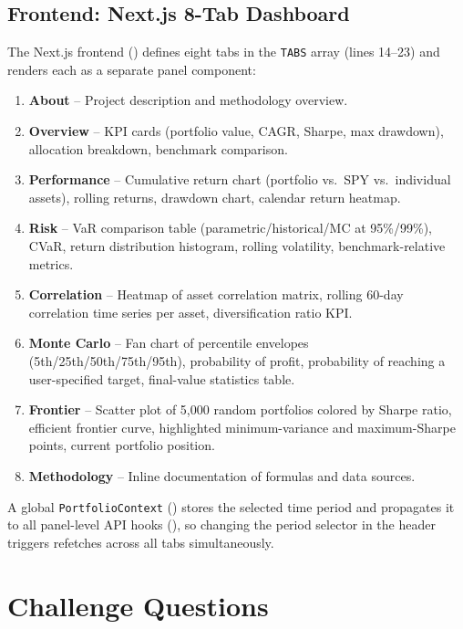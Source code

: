 \subsection{Frontend: Next.js 8-Tab Dashboard}

The Next.js frontend () defines eight tabs in the \texttt{TABS} array (lines 14--23) and renders each as a separate panel component:

\begin{enumerate}
  \item \textbf{About} -- Project description and methodology overview.
  \item \textbf{Overview} -- KPI cards (portfolio value, CAGR, Sharpe, max drawdown), allocation breakdown, benchmark comparison.
  \item \textbf{Performance} -- Cumulative return chart (portfolio vs.\ SPY vs.\ individual assets), rolling returns, drawdown chart, calendar return heatmap.
  \item \textbf{Risk} -- VaR comparison table (parametric/historical/MC at 95\%/99\%), CVaR, return distribution histogram, rolling volatility, benchmark-relative metrics.
  \item \textbf{Correlation} -- Heatmap of asset correlation matrix, rolling 60-day correlation time series per asset, diversification ratio KPI.
  \item \textbf{Monte Carlo} -- Fan chart of percentile envelopes (5th/25th/50th/75th/95th), probability of profit, probability of reaching a user-specified target, final-value statistics table.
  \item \textbf{Frontier} -- Scatter plot of 5{,}000 random portfolios colored by Sharpe ratio, efficient frontier curve, highlighted minimum-variance and maximum-Sharpe points, current portfolio position.
  \item \textbf{Methodology} -- Inline documentation of formulas and data sources.
\end{enumerate}

A global \texttt{PortfolioContext} () stores the selected time period and propagates it to all panel-level API hooks (), so changing the period selector in the header triggers refetches across all tabs simultaneously.

\section{Challenge Questions}
\label{sec:portfolio-challenges}

